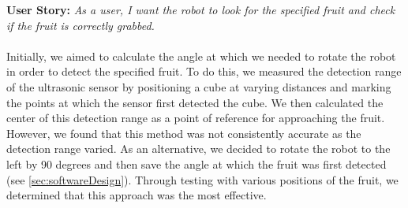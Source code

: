 \textbf{User Story:} \emph{As a user, I want the robot to look for the specified   fruit and check if the fruit is correctly grabbed.}\\
~\\
Initially, we aimed to calculate the angle at which we needed to rotate the robot in order to detect the specified fruit. To do this, we measured the detection range of the ultrasonic sensor by positioning a cube at varying distances and marking the points at which the sensor first detected the cube. We then calculated the center of this detection range as a point of reference for approaching the fruit. However, we found that this method was not consistently accurate as the detection range varied. As an alternative, we decided to rotate the robot to the left by 90 degrees and then save the angle at which the fruit was first detected (see \vref{sec:softwareDesign}). Through testing with various positions of the fruit, we determined that this approach was the most effective.

